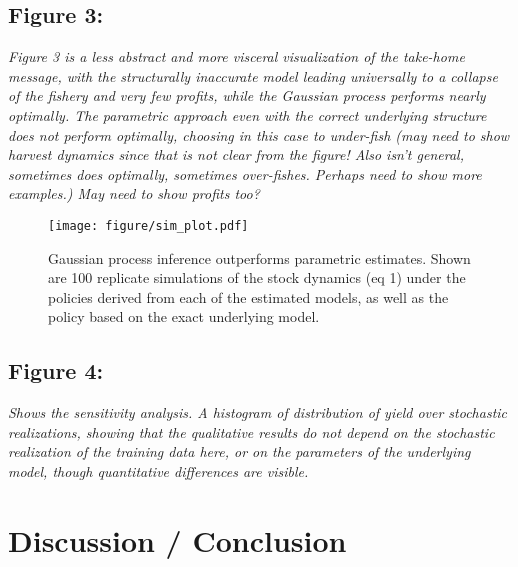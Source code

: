 \documentclass[author-year, review]{elsarticle} %
\makeatletter
\def\maxwidth{\ifdim\Gin@nat@width>\linewidth\linewidth
\else\Gin@nat@width\fi}
\let\Oldincludegraphics\includegraphics
\renewcommand{\includegraphics}[1]{\Oldincludegraphics[width=\maxwidth]{#1}}
\makeatother
\begin{document}
\subsection{Figure 3:}

\emph{Figure 3 is a less abstract and more visceral visualization of the
take-home message, with the structurally inaccurate model leading
universally to a collapse of the fishery and very few profits, while the
Gaussian process performs nearly optimally. The parametric approach even
with the correct underlying structure does not perform optimally,
choosing in this case to under-fish (may need to show harvest dynamics
since that is not clear from the figure! Also isn't general, sometimes
does optimally, sometimes over-fishes. Perhaps need to show more
examples.) May need to show profits too?}

\begin{figure}[htbp]
\centering
\texttt{[image: figure/sim\_plot.pdf]}
\caption{Gaussian process inference outperforms parametric estimates.
Shown are 100 replicate simulations of the stock dynamics (eq 1) under
the policies derived from each of the estimated models, as well as the
policy based on the exact underlying model.}
\end{figure}

\subsection{Figure 4:}

\emph{Shows the sensitivity analysis. A histogram of distribution of
yield over stochastic realizations, showing that the qualitative results
do not depend on the stochastic realization of the training data here,
or on the parameters of the underlying model, though quantitative
differences are visible.}

\section{Discussion / Conclusion}
\end{document}
